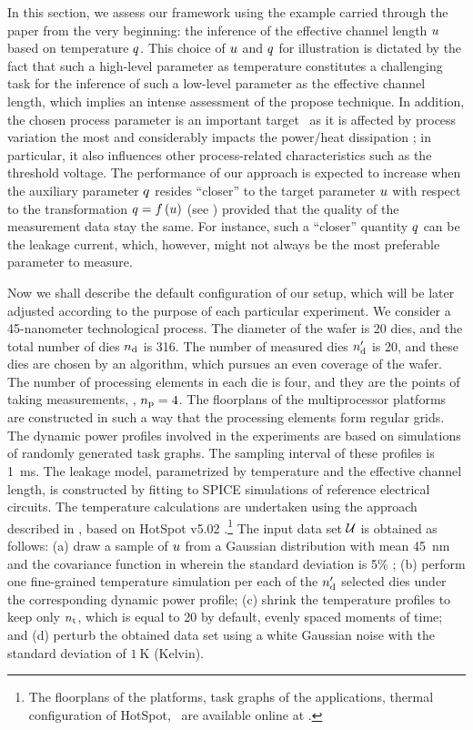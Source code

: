 
In this section, we assess our framework using the example carried through the paper from the very beginning: the inference of the effective channel length $u$ based on temperature $q$.
This choice of $u$ and $q$ for illustration is dictated by the fact that such a high-level parameter as temperature constitutes a challenging task for the inference of such a low-level parameter as the effective channel length, which implies an intense assessment of the propose technique.
In addition, the chosen process parameter is an important target \perse\ as it is affected by process variation the most and considerably impacts the power/heat dissipation \cite{chandrakasan2001, srivastava2010, juan2012}; in particular, it also influences other process-related characteristics such as the threshold voltage.
The performance of our approach is expected to increase when the auxiliary parameter $q$ resides ``closer'' to the target parameter $u$ with respect to the transformation $\q = \oBB{\u}$ (see ) provided that the quality of the measurement data stay the same.
For instance, such a ``closer'' quantity $q$ can be the leakage current, which, however, might not always be the most preferable parameter to measure.

Now we shall describe the default configuration of our setup, which will be later adjusted according to the purpose of each particular experiment.
We consider a 45-nanometer technological process.
The diameter of the wafer is 20 dies, and the total number of dies ${n_\text{d}}$ is 316.
The number of measured dies ${n_\text{d}'}$ is 20, and these dies are chosen by an algorithm, which pursues an even coverage of the wafer.
The number of processing elements in each die is four, and they are the points of taking measurements, \ie, ${n_\text{p}} = 4$.
The floorplans of the multiprocessor platforms are constructed in such a way that the processing elements form regular grids.
The dynamic power profiles involved in the experiments are based on simulations of randomly generated task graphs.
The sampling interval of these profiles is 1~ms.
The leakage model, parametrized by temperature and the effective channel length, is constructed by fitting to SPICE simulations of reference electrical circuits.
The temperature calculations are undertaken using the approach described in \cite{ukhov2012}, based on HotSpot v5.02 \cite{hotspot}.\footnote{The floorplans of the platforms, task graphs of the applications, thermal configuration of HotSpot, \etc\ are available online at \cite{sources}.}
The input data set $\mathcal{U}$ is obtained as follows: (a) draw a sample of $u$ from a Gaussian distribution with mean 45~nm and the covariance function in  wherein the standard deviation is 5\% \cite{juan2012}; (b) perform one fine-grained temperature simulation per each of the ${n_\text{d}'}$ selected dies under the corresponding dynamic power profile; (c) shrink the temperature profiles to keep only ${n_\text{t}}$, which is equal to 20 by default, evenly spaced moments of time; and (d) perturb the obtained data set using a white Gaussian noise with the standard deviation of $1~\text{K}$ (Kelvin).

